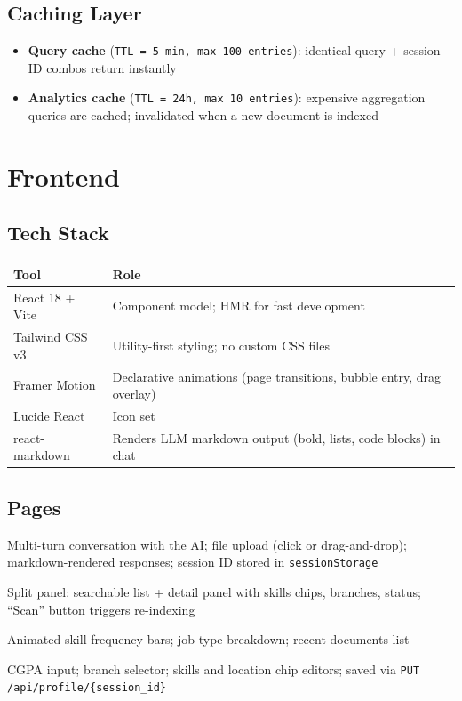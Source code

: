 \documentclass[12pt, a4paper]{article}
\begin{document}
\subsection{Caching Layer}

\begin{itemize}[noitemsep]
    \item \textbf{Query cache} (\texttt{TTL = 5 min, max 100 entries}): identical query + session ID combos return instantly
    \item \textbf{Analytics cache} (\texttt{TTL = 24h, max 10 entries}): expensive aggregation queries are cached; invalidated when a new document is indexed
\end{itemize}

\section{Frontend}

\subsection{Tech Stack}

\begin{tabularx}{\textwidth}{lX}
\toprule
\textbf{Tool} & \textbf{Role} \\
\midrule
React 18 + Vite    & Component model; HMR for fast development \\
Tailwind CSS v3    & Utility-first styling; no custom CSS files \\
Framer Motion      & Declarative animations (page transitions, bubble entry, drag overlay) \\
Lucide React       & Icon set \\
react-markdown     & Renders LLM markdown output (bold, lists, code blocks) in chat \\
\bottomrule
\end{tabularx}

\subsection{Pages}

\begin{description}[leftmargin=2cm, style=nextline]
    \item[Chat Page] Multi-turn conversation with the AI; file upload (click or drag-and-drop); markdown-rendered responses; session ID stored in \texttt{sessionStorage}
    \item[Browse JDs] Split panel: searchable list + detail panel with skills chips, branches, status; ``Scan'' button triggers re-indexing
    \item[Analytics] Animated skill frequency bars; job type breakdown; recent documents list
    \item[Profile] CGPA input; branch selector; skills and location chip editors; saved via \texttt{PUT /api/profile/\{session\_id\}}
\end{description}
\end{document}
